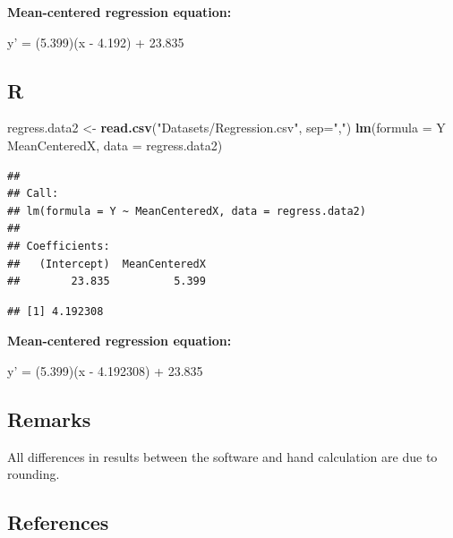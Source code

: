 \documentclass[
]{book}
\newenvironment{Shaded}{\begin{snugshade}}{\end{snugshade}}
\newcommand{\DataTypeTok}[1]{\textcolor[rgb]{0.13,0.29,0.53}{#1}}
\newcommand{\KeywordTok}[1]{\textcolor[rgb]{0.13,0.29,0.53}{\textbf{#1}}}
\newcommand{\NormalTok}[1]{#1}
\newcommand{\OperatorTok}[1]{\textcolor[rgb]{0.81,0.36,0.00}{\textbf{#1}}}
\newcommand{\StringTok}[1]{\textcolor[rgb]{0.31,0.60,0.02}{#1}}
\begin{document}
\textbf{Mean-centered regression equation:}

y' = (5.399)(x - 4.192) + 23.835

\hypertarget{r-1}{%
\subsection{R}\label{r-1}}

\begin{Shaded}
\begin{Highlighting}[]
\NormalTok{regress.data2 <-}\StringTok{ }\KeywordTok{read.csv}\NormalTok{(}\StringTok{"Datasets/Regression.csv"}\NormalTok{, }\DataTypeTok{sep=}\StringTok{","}\NormalTok{)}
\KeywordTok{lm}\NormalTok{(}\DataTypeTok{formula =}\NormalTok{ Y }\OperatorTok{~}\StringTok{ }\NormalTok{MeanCenteredX, }\DataTypeTok{data =}\NormalTok{ regress.data2)}
\end{Highlighting}
\end{Shaded}

\begin{verbatim}
## 
## Call:
## lm(formula = Y ~ MeanCenteredX, data = regress.data2)
## 
## Coefficients:
##   (Intercept)  MeanCenteredX  
##        23.835          5.399
\end{verbatim}

\begin{Shaded}
\end{Shaded}

\begin{verbatim}
## [1] 4.192308
\end{verbatim}

\textbf{Mean-centered regression equation:}

y' = (5.399)(x - 4.192308) + 23.835

\hypertarget{remarks-1}{%
\subsection{Remarks}\label{remarks-1}}

All differences in results between the software and hand calculation are due to rounding.

\hypertarget{references-1}{%
\subsection{References}\label{references-1}}
\end{document}

